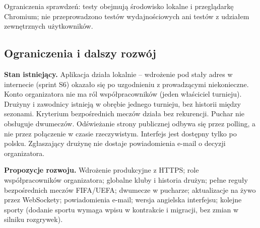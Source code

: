 \documentclass[11pt,a4paper,oneside]{article}
\newif\ifpodpowiedzi
\newcommand{\podpowiedz}[1]{\ifpodpowiedzi\par\begingroup\small\color{hintcolor}\textit{Wskazówka: #1}\par\endgroup\fi}
\begin{document}
Ograniczenia sprawdzeń: testy obejmują środowisko lokalne i przeglądarkę Chromium; nie przeprowadzono testów wydajnościowych ani testów z udziałem zewnętrznych użytkowników.

\subsection{Ograniczenia i dalszy rozwój}
\podpowiedz{Wskaż znane błędy, ograniczenia techniczne, niespełnione wymagania i zależności wpływające na dalszą pracę. Oddziel stan istniejący od propozycji rozwoju.}
\textbf{Stan istniejący.} Aplikacja działa lokalnie -- wdrożenie pod stały adres w internecie (sprint S6) okazało się po uzgodnieniu z prowadzącymi niekonieczne. Konto organizatora nie ma ról współpracowników (jeden właściciel turnieju). Drużyny i zawodnicy istnieją w obrębie jednego turnieju, bez historii między sezonami. Kryterium bezpośrednich meczów działa bez rekurencji. Puchar nie obsługuje dwumeczów. Odświeżanie strony publicznej odbywa się przez polling, a nie przez połączenie w czasie rzeczywistym. Interfejs jest dostępny tylko po polsku. Zgłaszający drużynę nie dostaje powiadomienia e-mail o decyzji organizatora.

\textbf{Propozycje rozwoju.} Wdrożenie produkcyjne z HTTPS; role współpracowników organizatora; globalne kluby i historia drużyn; pełne reguły bezpośrednich meczów FIFA/UEFA; dwumecze w pucharze; aktualizacje na żywo przez WebSockety; powiadomienia e-mail; wersja angielska interfejsu; kolejne sporty (dodanie sportu wymaga wpisu w kontrakcie i migracji, bez zmian w silniku rozgrywek).
\end{document}
